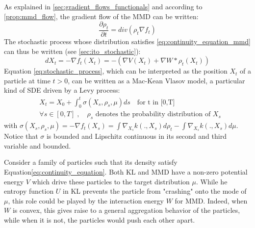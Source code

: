 As explained in \cref{sec:gradient_flows_functionals} and according to \cref{prop:mmd_flow}, the gradient flow of the MMD can be written:
\begin{equation}\label{eq:continuity_equation_mmd}
\frac{\partial \rho_t}{\partial t}= div(\rho_t  \nabla f_t)
\end{equation}
The stochastic process whose distribution satisfies \cref{eq:continuity_equation_mmd} can thus be written (see \cref{sec:ito_stochastic}):
\begin{equation}\label{eq:stochastic_process}
dX_t=-\nabla f_t(X_t) = - (\nabla V (X_t) + \nabla W * \rho_t(X_t))
\end{equation}
 Equation \cref{eq:stochastic_process}, which can be interpreted as the position $X_t$ of a particle at time $t > 0$, can be written as a Mac-Kean Vlasov model, a particular kind of SDE driven by a Levy process:
\begin{align}\label{eq:theoretical_process}
&X_t=X_{0}+\int_{0}^t \sigma(X_s, \rho_s, \mu)ds \quad \text{for t in [0,T]}\\
&\forall s \in [0,T]\;,\quad \rho_s \text{ denotes the probability distribution of } X_s
\end{align}
with $\sigma(X_s, \rho_s, \mu)=-\nabla f_t(X_s)=\int \nabla_{X_s}k(.,X_s) d\rho_t -  \int \nabla_{X_s}k(.,X_s) d\mu$. Notice that $\sigma$ is bounded  and Lipschitz continuous in its second and third variable and bounded.

\begin{remark}
	Consider a family of particles such that its density satisfy Equation\cref{eq:continuity_equation}. Both KL and MMD have a non-zero potential energy $V$ which drive these particles to the target distribution $\mu$. While he entropy function $U$ in KL prevents the particle from "crashing" onto the mode of $\mu$, this role could be played by the interaction energy $W$ for MMD. Indeed, when $W$ is convex, this gives raise to a general
	aggregation behavior of the particles, while when it is not, the particles would push each other apart.
\end{remark}


